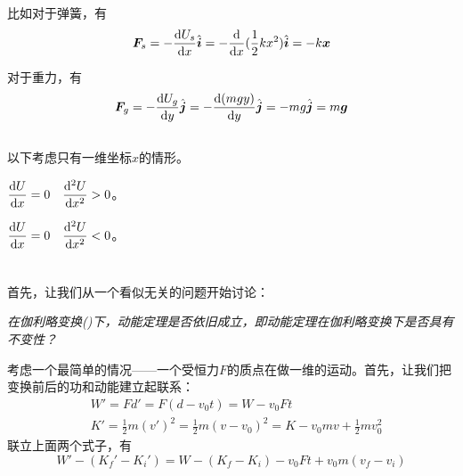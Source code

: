 比如对于弹簧，有
\[\vec{F}_{s}=-\frac{\dif U_{s}}{\dif x}\hat{\vec{i}}=-\frac{\dif }{\dif x}(\frac{1}{2}kx^{2})\hat{\vec{i}}=-k\vec{x}\]

对于重力，有
\[\vec{F}_{g}=-\frac{\dif U_{g}}{\dif y}\hat{\vec{j}}=-\frac{\dif (mgy)}{\dif y}\hat{\vec{j}}=-mg\hat{\vec{j}}=m\vec{g}\]

\subsection[系统的平衡性]{}
以下考虑只有一维坐标$x$的情形。
\begin{Itemize}
    \item {}$\dfrac{\dif U}{\dif x}=0\quad\dfrac{\dif ^2U}{\dif x^{2} }>0$。
    \item {}$\dfrac{\dif U}{\dif x}=0\quad\dfrac{\dif ^2U}{\dif x^{2} }<0$。
\end{Itemize}
\section[动量守恒]{}

\subsection[动量定理]{}
首先，让我们从一个看似无关的问题开始讨论：

\emph{在伽利略变换()下，动能定理是否依旧成立，即动能定理在伽利略变换下是否具有不变性？}

考虑一个最简单的情况——一个受恒力$F$的质点在做一维的运动。首先，让我们把变换前后的功和动能建立起联系：
\begin{equation}
    \begin{aligned}
         & W'=Fd'=F(d-v_{0}t)=W-v_{0}Ft                                                      \\
         & K'=\frac{1}{2}m(v')^{2}=\frac{1}{2}m(v-v_{0})^{2}=K-v_{0}mv+\frac{1}{2}mv_{0}^{2}
    \end{aligned}
    \nonumber
\end{equation}
联立上面两个式子，有
\[W'-(K_{f}'-K_{i}')=W-(K_{f}-K_{i})-v_{0}Ft+v_{0}m(v_{f}-v_{i})\]

